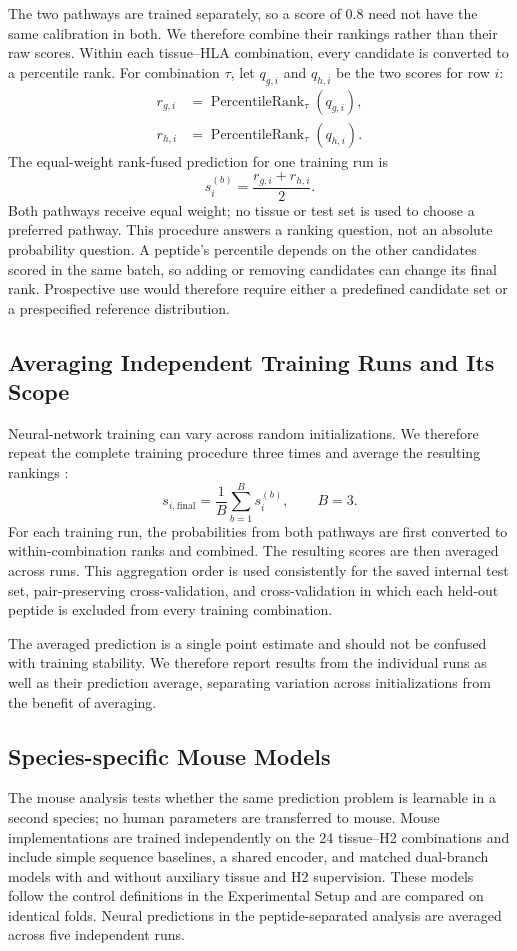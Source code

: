 The two pathways are trained separately, so a score of 0.8 need not have the same calibration in both. We therefore combine their rankings rather than their raw scores. Within each tissue--HLA combination, every candidate is converted to a percentile rank. For combination \(\tau\), let \(q_{g,i}\) and \(q_{h,i}\) be the two scores for row \(i\):
\[
\begin{aligned}
r_{g,i}
&=
\operatorname{PercentileRank}_{\tau}(q_{g,i}),\\
r_{h,i}
&=
\operatorname{PercentileRank}_{\tau}(q_{h,i}).
\end{aligned}
\]
The equal-weight rank-fused prediction for one training run is
\[
s_i^{(b)}
=
\frac{r_{g,i}+r_{h,i}}{2}.
\]
Both pathways receive equal weight; no tissue or test set is used to choose a preferred pathway. This procedure answers a ranking question, not an absolute probability question. A peptide's percentile depends on the other candidates scored in the same batch, so adding or removing candidates can change its final rank. Prospective use would therefore require either a predefined candidate set or a prespecified reference distribution.

\subsection{Averaging Independent Training Runs and Its Scope}

Neural-network training can vary across random initializations. We therefore repeat the complete training procedure three times and average the resulting rankings \cite{lakshminarayanan2017deep}:
\[
s_{i,\mathrm{final}}
=
\frac{1}{B}
\sum_{b=1}^{B}
s_i^{(b)},
\qquad B=3.
\]
For each training run, the probabilities from both pathways are first converted to within-combination ranks and combined. The resulting scores are then averaged across runs. This aggregation order is used consistently for the saved internal test set, pair-preserving cross-validation, and cross-validation in which each held-out peptide is excluded from every training combination.

The averaged prediction is a single point estimate and should not be confused with training stability. We therefore report results from the individual runs as well as their prediction average, separating variation across initializations from the benefit of averaging.

\subsection{Species-specific Mouse Models}

The mouse analysis tests whether the same prediction problem is learnable in a second species; no human parameters are transferred to mouse. Mouse implementations are trained independently on the 24 tissue--H2 combinations and include simple sequence baselines, a shared encoder, and matched dual-branch models with and without auxiliary tissue and H2 supervision. These models follow the control definitions in the Experimental Setup and are compared on identical folds. Neural predictions in the peptide-separated analysis are averaged across five independent runs.

